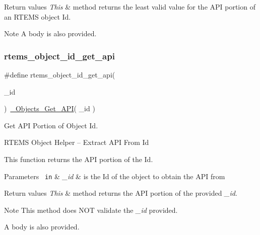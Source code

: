 \begin{DoxyRetVals}{Return values}
{\em This} & method returns the least valid value for the A\+PI portion of an R\+T\+E\+MS object Id.\\
\hline
\end{DoxyRetVals}
\begin{DoxyNote}{Note}
A body is also provided. 
\end{DoxyNote}
\mbox{\label{group__ClassicClassInfo_ga8eaead233ac75fec14889179a4131bd9}} 
\subsubsection{\texorpdfstring{rtems\_object\_id\_get\_api}{rtems\_object\_id\_get\_api}}
{\footnotesize\ttfamily \#define rtems\+\_\+object\+\_\+id\+\_\+get\+\_\+api(\begin{DoxyParamCaption}\item[{}]{\+\_\+id }\end{DoxyParamCaption})~\mbox{\hyperlink{group__RTEMSScoreObject_ga907a0412d7c657fa047641444090fe7b}{\+\_\+\+Objects\+\_\+\+Get\+\_\+\+A\+PI}}( \+\_\+id )}



Get A\+PI Portion of Object Id. 

R\+T\+E\+MS Object Helper -- Extract A\+PI From Id

This function returns the A\+PI portion of the Id.


\begin{DoxyParams}[1]{Parameters}
\mbox{\texttt{ in}}  & {\em \+\_\+id} & is the Id of the object to obtain the A\+PI from\\
\hline
\end{DoxyParams}

\begin{DoxyRetVals}{Return values}
{\em This} & method returns the A\+PI portion of the provided {\itshape \+\_\+id}.\\
\hline
\end{DoxyRetVals}
\begin{DoxyNote}{Note}
This method does N\+OT validate the {\itshape \+\_\+id} provided.

A body is also provided. 
\end{DoxyNote}
\mbox{\label{group__ClassicClassInfo_ga99ed333220b605c83b1c5ddfcedd9d87}} 
